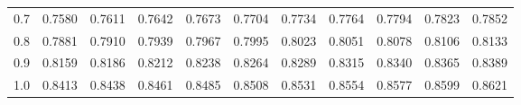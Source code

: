 \begin{tabular}{l|llllllllll}
0.7 &                     0.7580 &                     0.7611 &                     0.7642 &                     0.7673 &                     0.7704 &                     0.7734 &                     0.7764 &                     0.7794 &                     0.7823 &                     0.7852 \\
0.8 &  \cellcolor{gray!20}0.7881 &  \cellcolor{gray!20}0.7910 &  \cellcolor{gray!20}0.7939 &  \cellcolor{gray!20}0.7967 &  \cellcolor{gray!20}0.7995 &  \cellcolor{gray!20}0.8023 &  \cellcolor{gray!20}0.8051 &  \cellcolor{gray!20}0.8078 &  \cellcolor{gray!20}0.8106 &  \cellcolor{gray!20}0.8133 \\
0.9 &                     0.8159 &                     0.8186 &                     0.8212 &                     0.8238 &                     0.8264 &                     0.8289 &                     0.8315 &                     0.8340 &                     0.8365 &                     0.8389 \\
1.0 &  \cellcolor{gray!20}0.8413 &  \cellcolor{gray!20}0.8438 &  \cellcolor{gray!20}0.8461 &  \cellcolor{gray!20}0.8485 &  \cellcolor{gray!20}0.8508 &  \cellcolor{gray!20}0.8531 &  \cellcolor{gray!20}0.8554 &  \cellcolor{gray!20}0.8577 &  \cellcolor{gray!20}0.8599 &  \cellcolor{gray!20}0.8621 \\

\bottomrule
\end{tabular}